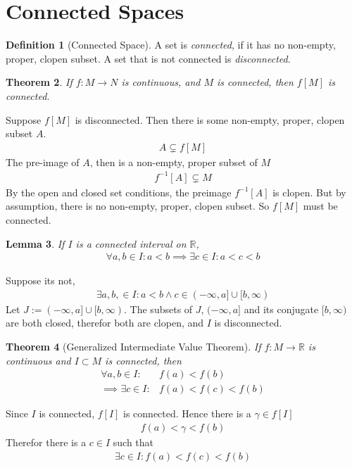 \documentclass{amsart}
\numberwithin{equation}{section}
\let\oldendproof\endproof
\renewenvironment{proof}[1][\proofname]{%
  \setcounter{case}{0}
  \setcounter{step}{0}
  \oldproof[#1]%
}{\oldendproof}
\theoremstyle{plain}
\newtheorem{theorem}{Theorem}[section]
\newtheorem{lemma}[theorem]{Lemma}
\theoremstyle{definition}
\newtheorem{definition}[theorem]{Definition}
\theoremstyle{remark}
\begin{document}
\section{Connected Spaces}

\begin{definition}[Connected Space]
  A set is \emph{connected}, if it has no non-empty, proper, clopen subset. A set that is not connected is \emph{disconnected}.
\end{definition}

\begin{theorem}
  If $f:M\to N$ is continuous, and $M$ is connected, then $f[M]$ is connected.
\end{theorem}
\begin{proof}
  Suppose $f[M]$ is disconnected. Then there is some non-empty, proper, clopen subset $A$.
  \begin{align}
    A \subsetneq f[M]
  \end{align}
  The pre-image of $A$, then is a non-empty, proper subset of $M$
  \begin{align}
    f^{-1}[A] \subsetneq M
  \end{align}
  By the open and closed set conditions, the preimage $f^{-1}[A]$ is clopen.
  But by assumption, there is no non-empty, proper, clopen subset. So $f[M]$ must be connected.
\end{proof}

\begin{lemma}
  If $I$ is a connected interval on $\mathbb{R}$,
  \begin{align}
    \forall a,b\in I: a< b \implies \exists c\in I: a<c<b
  \end{align}
\end{lemma}
\begin{proof}
  Suppose its not,
  \begin{align}
    \exists a,b,\in I: a<b \land c\in (-\infty, a] \cup [b, \infty)
  \end{align}
  Let $J:= (-\infty, a] \cup [b, \infty)$. The subsets of $J$, $(-\infty, a]$ and its conjugate $[b,\infty)$ are both closed, therefor both are clopen, and $I$ is disconnected.
\end{proof}

\begin{theorem}[Generalized Intermediate Value Theorem]
  If $f:M\to \mathbb{R}$ is continuous and $I \subset M$ is connected, then
  \begin{align}
    \forall a,b\in I: &f(a) < f(b) \nonumber\\
    \implies \exists c\in I:& f(a) < f(c) < f(b)
  \end{align}
\end{theorem}
\begin{proof}
  Since $I$ is connected, $f[I]$ is connected. Hence there is a $\gamma\in f[I]$
  \begin{align}
    f(a) < \gamma< f(b)
  \end{align}
  Therefor there is a $c\in I$ such that
  \begin{align}
    \exists c \in I : f(a) < f(c) < f(b)
  \end{align}
\end{proof}
\end{document}
